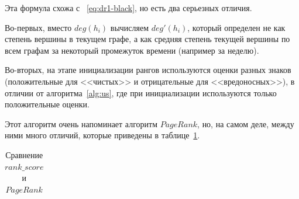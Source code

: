 \documentclass[a4paper,14pt]{extreport} %
\begin{document}
Эта формула схожа с ~\ref{eq:dr1-black}, но есть два серьезных отличия. 

Во-первых, вместо $deg(h_i)$ вычисляем $deg'(h_i)$, который определен не как степень вершины в текущем графе, а как средняя степень текущей вершины по всем графам за некоторый промежуток времени (например за неделю). 

Во-вторых, на этапе инициализации рангов используются оценки разных знаков (положительные для <<чистых>> и отрицательные для <<вредоносных>>), в отличии от алгоритма~\ref{alg:us}, где при инициализации используются только положительные оценки. 

Этот алгоритм очень напоминает алгоритм $PageRank$, но, на самом деле, между ними много отличий, которые приведены в таблице~\ref{tab:pr}.

\begin{table}[H]
\centering
\caption{Сравнение $rank\_score$ и $PageRank$}\label{tab:pr}
\begin{tabular}{|p{7cm}|p{7cm}|}


\end{tabular}
\end{table}
\end{document}
